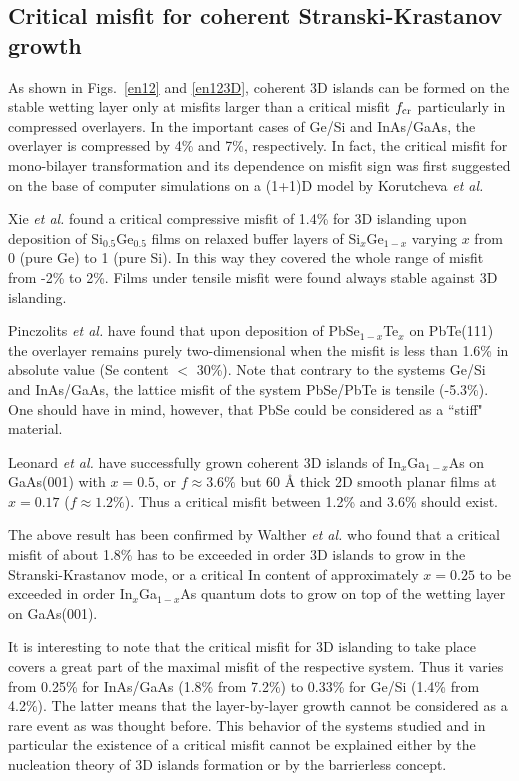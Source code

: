 \documentclass[aps,prl,showpacs,twocolumn,byrevtex,floatfix]{revtex4-1}
\begin{document}
\subsection{Critical misfit for coherent Stranski-Krastanov growth}

As shown in Figs.\ \ref{en12} and \ref{en123D}, coherent 3D islands can be
formed on the stable wetting layer only at misfits larger than a critical
misfit $f_{\rm cr}$ particularly in compressed overlayers. In the important
cases of Ge/Si\cite{Voigt01,Eagles95} and InAs/GaAs\cite{Joyce04,Wu15}, the
overlayer is compressed by 4\% and 7\%, respectively. In fact, the
critical misfit for mono-bilayer transformation and its dependence on misfit
sign was first suggested on the base of computer simulations on a (1+1)D 
model by Korutcheva {\it et al.}\cite{Korutcheva00}

Xie {\it et al.}\cite{Xie94} found a critical compressive misfit of 1.4\% for 3D
islanding upon deposition of Si$_{0.5}$Ge$_{0.5}$ films on relaxed buffer layers
of Si$_{x}$Ge$_{1-x}$ varying $x$ from 0 (pure Ge) to 1 (pure Si). In this way
they covered the whole range of misfit from -2\% to 2\%. Films under tensile
misfit were found always stable against 3D islanding.

Pinczolits {\it et al.}\cite{Pinczolits98} have found that upon deposition of
PbSe$_{1-x}$Te$_{x}$ on PbTe(111) the overlayer remains purely two-dimensional
when the misfit is less than 1.6\% in absolute value (Se content $<$ 30\%).
Note that contrary to the systems Ge/Si and InAs/GaAs, the lattice misfit of the
system PbSe/PbTe is tensile (-5.3\%). One should have in mind, however, that
PbSe could be considered as a ``stiff" material.\cite{Petersen14}

Leonard {\it et al.} \cite{Leonard93} have successfully grown coherent 3D
islands of In$_{x}$Ga$_{1-x}$As on GaAs(001) with $x = 0.5$, or $f \approx
3.6\%$ but 60 {\AA} thick 2D smooth planar films at $x = 0.17$ ($f \approx
1.2\%$). Thus a critical misfit between 1.2\% and 3.6\% should exist.

The above result has been confirmed by Walther {\it et al.}\cite{Walther01}
who found that a critical misfit of about 1.8\% has to be exceeded in order 3D
islands to grow in the Stranski-Krastanov mode, or a critical In content of 
approximately $x = 0.25$ to be exceeded in order In$_{x}$Ga$_{1-x}$As
quantum dots to grow on top of the wetting layer on GaAs(001).

It is interesting to note that the critical misfit for 3D islanding to take
place covers a great part of the maximal misfit of the respective system. Thus
it varies from 0.25\% for InAs/GaAs (1.8\% from 7.2\%) to 0.33\% for Ge/Si
(1.4\% from 4.2\%). The latter means that the layer-by-layer growth cannot be
considered as a rare event as was thought before. This behavior of the
systems studied and in particular the existence of a critical misfit cannot be
explained either by the nucleation theory of 3D islands formation or by the
barrierless concept.
\end{document}

